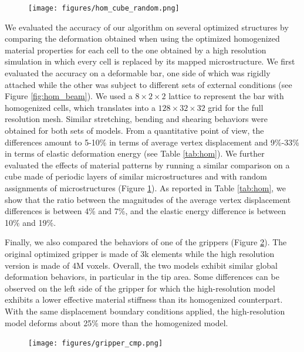 \begin{figure}[h]
	\centering
	\texttt{[image: figures/hom\_cube\_random.png]}	
	\caption{
		\label{fig:hom_cube_2}}
\end{figure}

We evaluated the accuracy of our algorithm on several optimized structures by comparing the deformation obtained when using the optimized homogenized material properties for each cell to the one obtained by a high resolution simulation in which every cell is replaced by its mapped microstructure.
We first evaluated the accuracy on a deformable bar, one side of which was rigidly attached while the other was subject to different sets of external conditions (see Figure \ref{fig:hom_beam}). We used a $8\times2\times2$ lattice to represent the bar with homogenized cells, which translates into a $128\times32\times32$ grid for the full resolution mesh. Similar stretching, bending and shearing behaviors were obtained for both sets of models. From a quantitative point of view, the differences amount to 5-10\% in terms of average vertex displacement and 9\%-33\% in terms of elastic deformation energy (see Table \ref{tab:hom}). We further evaluated the effects of material patterns by running a similar comparison on a cube made of periodic layers of similar microstructures and with random assignments of microstructures (Figure \ref{fig:hom_cube_2}).  As reported in Table \ref{tab:hom}, we show that the ratio between the magnitudes of the average vertex displacement differences is between 4\% and 7\%, and the elastic energy difference is between 10\% and 19\%.

Finally, we also compared the behaviors of one of the grippers (Figure \ref{fig:gripper_validate}). The original optimized gripper is made of 3k elements while the high resolution version is made of 4M voxels.
Overall, the two models exhibit similar global deformation behaviors, in particular in the tip area. Some differences can be observed on the left side of the gripper for which the high-resolution model exhibits a lower effective material stiffness than its homogenized counterpart. With the same displacement boundary conditions applied, the high-resolution model deforms about 25\% more than the homogenized model.
	
	\begin{figure}[t]
		\centering
		\texttt{[image: figures/gripper\_cmp.png]}	
		\caption{
			\label{fig:gripper_validate}}
	\end{figure}
	
